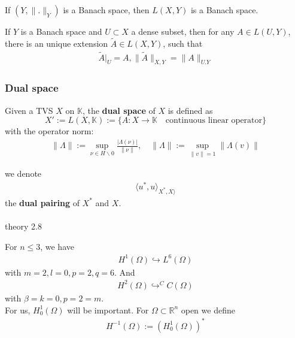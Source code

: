\begin{theorem}
	If $(Y, \|.\|_Y)$ is a Banach space, then $L(X, Y)$ is a Banach space. 
\end{theorem}

\begin{theorem}
	If $Y$ is a Banach space and $U\subset X$ a dense subset, then for any $A \in L(U, Y)$, there is an unique extension $\tilde{A} \in L(X, Y)$, such that
	\begin{align*}
		\tilde{A}|_U = A, \|\tilde{A}\|_{X,Y} = \|A\|_{U. Y}
	\end{align*}
\end{theorem}

\subsubsection*{Dual space}

\begin{definition}
	Given a TVS $X$ on $\mathbb{K}$, the \textbf{dual space} of $X$ is defined as
	\begin{equation*}
		X' := L(X, \mathbb{K}) := \{ A: X \rightarrow \mathbb{K} \quad \text{continuous linear operator}\}
	\end{equation*}
	with the operator norm:
	\begin{align*}
	\|\Lambda\|:= \sup_{\nu \in H \backslash 0} \frac{|\Lambda (\nu)|}{\|\nu\|}, \quad \|\Lambda\|:= \sup_{\|v\| = 1} \|\Lambda(v)\|
\end{align*}
\end{definition}

we denote 
\begin{align*}
	\langle u^*, u\rangle_{X^*, X\rangle}
\end{align*}
the \textbf{dual pairing} of $X^*$ and $X$. \\
\quad\\
theory 2.8
\begin{example}
	For $n \le 3$, we have
	\begin{align*}
		H^1(\Omega) \hookrightarrow L^6(\Omega)
	\end{align*}
	with $m = 2, l = 0, p = 2, q = 6$. And
	\begin{align*}
		H^2(\Omega) \hookrightarrow^C C(\Omega)
	\end{align*}
	with $\beta = k = 0, p = 2 = m$. \\
	For us, $H^1_0(\Omega)$ will be important. For $\Omega \subset \mathbb{R}^n$ open we define
	\begin{align*}
		H^{-1}(\Omega):= (H_0^1(\Omega))^*
	\end{align*}
\end{example}

